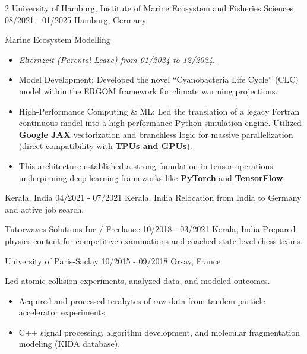 \documentclass{thejus_cv}
\begin{document}
\begin{paracol}{2}
             {University of Hamburg, Institute of Marine Ecosystem and Fisheries Sciences}
             {08/2021 - 01/2025}
             {Hamburg, Germany}
             {Marine Ecosystem Modelling
             \begin{itemize}
                 \item \textit{Elternzeit (Parental Leave) from 01/2024 to 12/2024.}
                 \item Model Development: Developed the novel ``Cyanobacteria Life Cycle'' (CLC) model within the ERGOM framework for climate warming projections.
                 \item High-Performance Computing \& ML: Led the translation of a legacy Fortran continuous model into a high-performance Python simulation engine. Utilized \textbf{Google JAX} vectorization and branchless logic for massive parallelization (direct compatibility with \textbf{TPUs and GPUs}).
                 \item This architecture established a strong foundation in tensor operations underpinning deep learning frameworks like \textbf{PyTorch} and \textbf{TensorFlow}.
             \end{itemize}}

             {Kerala, India}
             {04/2021 - 07/2021}
             {Kerala, India}
             {Relocation from India to Germany and active job search.}

             {Tutorwaves Solutions Inc / Freelance}
             {10/2018 - 03/2021}
             {Kerala, India}
             {Prepared physics content for competitive examinations and coached state-level chess teams.}

             {University of Paris-Saclay}
             {10/2015 - 09/2018}
             {Orsay, France}
             {Led atomic collision experiments, analyzed data, and modeled outcomes.
             \begin{itemize}
                 \item Acquired and processed terabytes of raw data from tandem particle accelerator experiments.
                 \item C++ signal processing, algorithm development, and molecular fragmentation modeling (KIDA database).
             \end{itemize}}


\switchcolumn


\end{paracol}
\end{document}
